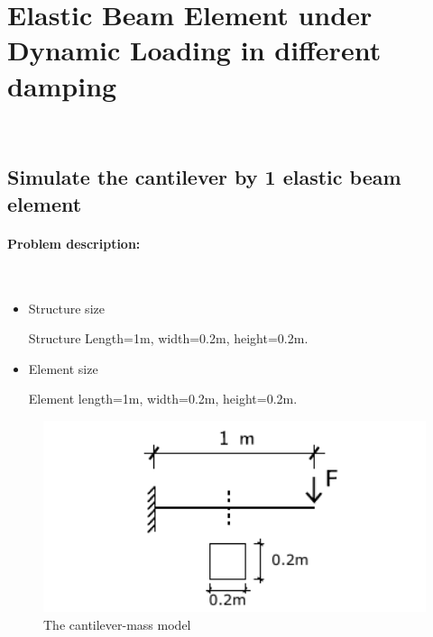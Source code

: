 
\newpage
\section{Elastic Beam Element under Dynamic Loading in different damping} ~ 
\subsection{Simulate the cantilever by 1 elastic beam element} 
\paragraph{Problem description:} ~

\begin{itemize}
  \item Structure size

    Structure Length=1m, width=0.2m, height=0.2m.

  \item Element size

    Element length=1m, width=0.2m, height=0.2m.
\end{itemize}

\begin{figure}[!htb]
  \centering
  \includegraphics[width=12cm]{./Figure-files/_Chapter_Appendix_Illustrative_Examples/cantilever.pdf}
  \caption{The cantilever-mass model}
  \label{fig_cantilev_1beam_damping}
\end{figure}


